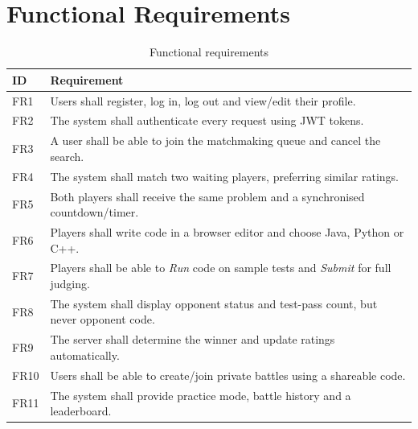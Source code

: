 \documentclass[12pt,a4paper,oneside]{report}
\begin{document}
\section{Functional Requirements}
\begin{table}[H]
\centering
\small
\begin{tabularx}{\textwidth}{@{}lX@{}}
\toprule
\textbf{ID} & \textbf{Requirement} \\
\midrule
FR1 & Users shall register, log in, log out and view/edit their profile. \\
FR2 & The system shall authenticate every request using JWT tokens. \\
FR3 & A user shall be able to join the matchmaking queue and cancel the search. \\
FR4 & The system shall match two waiting players, preferring similar ratings. \\
FR5 & Both players shall receive the same problem and a synchronised countdown/timer. \\
FR6 & Players shall write code in a browser editor and choose Java, Python or C++. \\
FR7 & Players shall be able to \emph{Run} code on sample tests and \emph{Submit} for full judging. \\
FR8 & The system shall display opponent status and test-pass count, but never opponent code. \\
FR9 & The server shall determine the winner and update ratings automatically. \\
FR10 & Users shall be able to create/join private battles using a shareable code. \\
FR11 & The system shall provide practice mode, battle history and a leaderboard. \\
\bottomrule
\end{tabularx}
\caption{Functional requirements}
\end{table}
\end{document}
